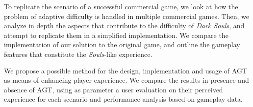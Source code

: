 To replicate the scenario of a successful commercial game, we look at how the problem of adaptive difficulty  is handled in multiple commercial games. Then, we analyze in depth the aspects that contribute to the difficulty of \emph{Dark Souls}, and attempt to replicate them in a simplified implementation. We compare the implementation of our solution to the original game, and outline the gameplay features that constitute the \emph{Souls}-like experience.

We propose a possible method for the design, implementation and usage of AGT as means of enhancing player experience. We compare the results in presence and absence of AGT, using as parameter a user evaluation on their perceived experience for each scenario and performance analysis based on gameplay data.